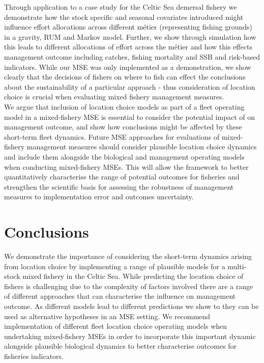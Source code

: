 \documentclass[12pt, halfline, a4paper]{ouparticle}
\begin{document}
Through application to a case study for the Celtic Sea demersal fishery we
demonstrate how the stock specific and seasonal covariates introduced might
influence effort allocations across different métier (representing fishing
grounds) in a gravity, RUM and Markov model. Further, we show through
simulation how this leads to different allocations of effort across the métier
and how this effects management outcome including catches, fishing mortality
and SSB and risk-based indicators. While our MSE was only implemented as a
demonstration, we show clearly that the decisions of fishers on where to fish
can effect the conclusions about the sustainability of a particular approach -
thus consideration of location choice is crucial when evaluating mixed fishery
management measures. \\

We argue that inclusion of location choice models as part of a fleet operating
model in a mixed-fishery MSE is essential to consider the potential impact of
on management outcome, and show how conclusions might be affected by these
short-term fleet dynamics. Future MSE approaches for evaluations of
mixed-fishery management measures should consider plausible location choice
dynamics and include them alongside the biological and management operating
models when conducting mixed-fishery MSEs. This will allow the framework to
better quantitatively characterise the range of potential outcomes for
fisheries and strengthen the scientific basis for assessing the robustness of
management measures to implementation error and outcomes uncertainty. 

\section{Conclusions} \label{con}

We demonstrate the importance of considering the short-term dynamics arising
from location choice by implementing a range of plausible models for a
multi-stock mixed fishery in the Celtic Sea. While predicting the location
choice of fishers is challenging due to the complexity of factors involved
there are a range of different approaches that can characterise the influence
on management outcome. As different models lead to different predictions we
show to they can be used as alternative hypotheses in an MSE setting. We
recommend implementation of different fleet location choice operating models
when undertaking mixed-fishery MSEs in order to incorporate this important
dynamic alongside plausible biological dynamics to better characterise outcomes
for fisheries indicators. 
\end{document}
